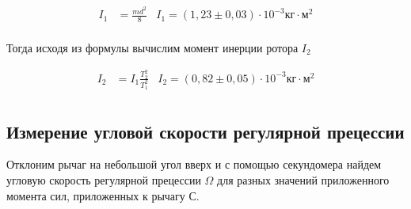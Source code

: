 \documentclass{article}
\begin{document}
\begin{align*}
  I_1 &= \frac{md^2}{8} & I_1 = (1,23 \pm 0,03) \cdot 10^{-3} кг \cdot м^2 \\
\end{align*}

Тогда исходя из формулы вычислим момент инерции ротора $I_2$

\begin{align*}
  I_2 &= I_1 \frac{T_2^2}{T_1^2} & I_2 = (0,82 \pm 0,05) \cdot 10^{-3} кг \cdot м^2 \\
\end{align*}


\subsection{Измерение угловой скорости регулярной прецессии}
Отклоним рычаг на небольшой угол вверх и с помощью секундомера найдем угловую скорость регулярной прецессии $\Omega$ для разных значений приложенного момента сил, приложенных к рычагу С.\\ 
\end{document}
